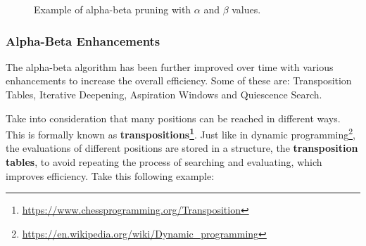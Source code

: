 \begin{figure}[H]

    \caption{Example of alpha-beta pruning with $\alpha$ and $\beta$ values.}
    \label{fig:alpha-beta-pruning-with-alpha-beta-values}
\end{figure}

\subsubsection{Alpha-Beta Enhancements}

The alpha-beta algorithm has been further improved over time with various enhancements to increase the overall efficiency. Some of these are: Transposition Tables, Iterative Deepening, Aspiration Windows and Quiescence Search.

\vspace{1em}

Take into consideration that many positions can be reached in different ways. This is formally known as \textbf{transpositions\footnote{\url{https://www.chessprogramming.org/Transposition}}}. Just like in dynamic programming\footnote{\url{https://en.wikipedia.org/wiki/Dynamic_programming}}, the evaluations of different positions are stored in a structure, the \textbf{transposition tables}, to avoid repeating the process of searching and evaluating, which improves efficiency. Take this following example:

